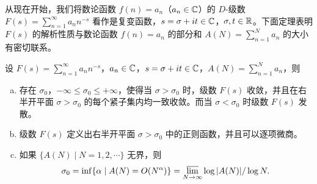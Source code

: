 \begin{sloppypar}
从现在开始，我们将数论函数 $f(n)=a_n$（$a_n\in\mathbb{C}$）的 $D$-级数 $F(s)=\sum_{n=1}^{\infty}a_nn^{-s}$ 看作是复变函数，$s=\sigma+it\in\mathbb{C}$，$\sigma,t\in\mathbb{R}$。下面定理表明 $F(s)$ 的解析性质与数论函数 $f(n)=a_n$ 的部分和 $A(N)=\sum_{n=1}^{N}a_n$ 的大小有密切联系。
\end{sloppypar}

\begin{theorem}\label{thm:4.1}
设 $F(s)=\sum_{n=1}^{\infty}a_nn^{-s}$，$a_n\in\mathbb{C}$，$s=\sigma+it\in\mathbb{C}$，$A(N)=\sum_{n=1}^{N}a_n$，则
\begin{enumerate}[(a)]
  \item 存在 $\sigma_0$，$-\infty\leqslant\sigma_0\leqslant+\infty$，使得当 $\sigma>\sigma_0$ 时，级数 $F(s)$ 收敛，并且在右半开平面 $\sigma>\sigma_0$ 的每个紧子集内均一致收敛。而当 $\sigma<\sigma_0$ 时级数 $F(s)$ 发散。
  \item 级数 $F(s)$ 定义出右半开平面 $\sigma>\sigma_0$ 中的正则函数，并且可以逐项微商。
  \item 如果 $\{A(N)\mid N=1,2,\cdots\}$ 无界，则
  \[
    \sigma_0=\inf\{\alpha\mid A(N)=O(N^{\alpha})\}
    =\varlimsup_{N\to\infty}\log|A(N)|/\log N.
  \]
\end{enumerate}
\end{theorem}

